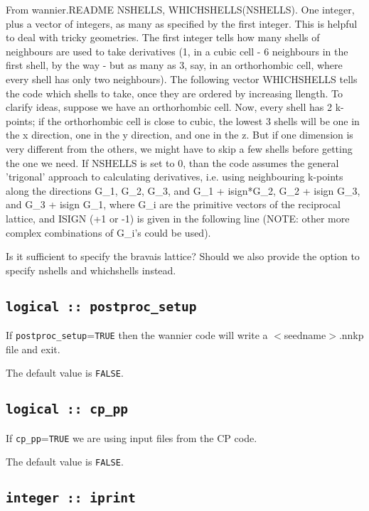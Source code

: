 From wannier.README
 NSHELLS, WHICHSHELLS(NSHELLS). One integer, plus a vector
of integers, as many as specified by the first integer. This is helpful to
deal with tricky geometries. The first integer tells how many shells of
neighbours are used to take derivatives (1, in a cubic cell - 6
neighbours in the first shell, by the way - but as many as 3, say, in
an orthorhombic cell, where every shell has only two neighbours). The
following vector WHICHSHELLS tells the code  which shells to take, once
they are ordered by increasing llength. To clarify ideas, suppose we have an
orthorhombic cell. Now, every shell has 2 k-points; if the orthorhombic
cell is close to cubic, the lowest 3 shells will be one in the x
direction, one in the y direction, and one in the z. But if one
dimension is very different from the others, we might have to skip a
few shells before getting the one we need. If NSHELLS is set to 0,
than the code assumes the general 'trigonal' approach to calculating
derivatives, i.e. using neighbouring k-points along the
directions G\_1, G\_2, G\_3, and G\_1 + isign*G\_2, G\_2 + isign G\_3, and
G\_3 + isign G\_1, where G\_i are the primitive vectors of the
reciprocal lattice, and ISIGN (+1 or -1) is given in the following
line (NOTE: other more complex combinations of G\_i's could be used).

Is it sufficient to specify the bravais lattice? Should we also provide
the option to specify nshells and whichshells instead.


\subsection[postproc\_setup]{\tt logical :: postproc\_setup}
If \verb#postproc_setup#=\verb#TRUE# then the wannier code will write 
a $<$seedname$>$.nnkp file and exit.

The default value is \verb#FALSE#.


\subsection[cp\_pp]{\tt logical :: cp\_pp}
If \verb#cp_pp#=\verb#TRUE# we are using input files from the CP code.
                                                                                                                              
The default value is \verb#FALSE#.


\subsection[iprint]{\tt integer :: iprint}

